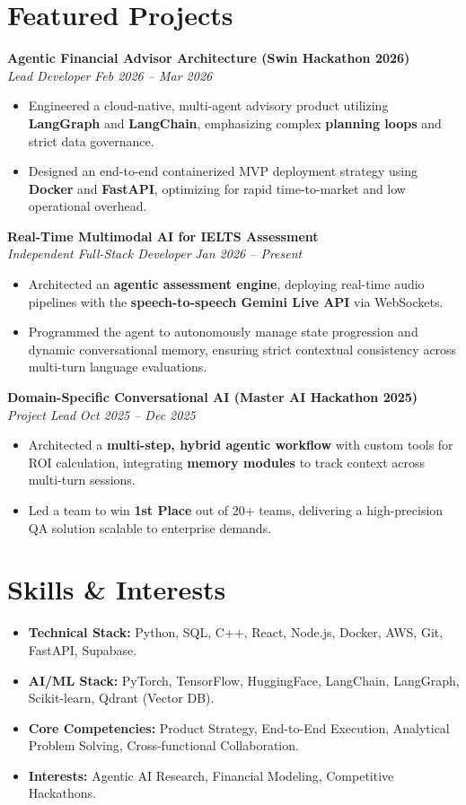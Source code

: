 \documentclass[10pt, letterpaper]{article}
\newcommand{\entryheader}[4]{
    \noindent\textbf{#1} \hfill #2 \\
    \textit{#3} \hfill \textit{#4} \par
}
\begin{document}
\section{Featured Projects}
\entryheader{Agentic Financial Advisor Architecture (Swin Hackathon 2026)}{}{Lead Developer}{Feb 2026 -- Mar 2026}
\begin{itemize}
    \item Engineered a cloud-native, multi-agent advisory product utilizing \textbf{LangGraph} and \textbf{LangChain}, emphasizing complex \textbf{planning loops} and strict data governance.
    \item Designed an end-to-end containerized MVP deployment strategy using \textbf{Docker} and \textbf{FastAPI}, optimizing for rapid time-to-market and low operational overhead.
\end{itemize}

\vspace{6pt}
\entryheader{Real-Time Multimodal AI for IELTS Assessment}{}{Independent Full-Stack Developer}{Jan 2026 -- Present}
\begin{itemize}
    \item Architected an \textbf{agentic assessment engine}, deploying real-time audio pipelines with the \textbf{speech-to-speech Gemini Live API} via WebSockets.
    \item Programmed the agent to autonomously manage state progression and dynamic conversational memory, ensuring strict contextual consistency across multi-turn language evaluations.
\end{itemize}

\vspace{6pt}
\entryheader{Domain-Specific Conversational AI (Master AI Hackathon 2025)}{}{Project Lead}{Oct 2025 -- Dec 2025}
\begin{itemize}
    \item Architected a \textbf{multi-step, hybrid agentic workflow} with custom tools for ROI calculation, integrating \textbf{memory modules} to track context across multi-turn sessions.
    \item Led a team to win \textbf{1st Place} out of 20+ teams, delivering a high-precision QA solution scalable to enterprise demands.
\end{itemize}

\section{Skills \& Interests}
\begin{itemize}
    \item \textbf{Technical Stack:} Python, SQL, C++, React, Node.js, Docker, AWS, Git, FastAPI, Supabase.
    \item \textbf{AI/ML Stack:} PyTorch, TensorFlow, HuggingFace, LangChain, LangGraph, Scikit-learn, Qdrant (Vector DB).
    \item \textbf{Core Competencies:} Product Strategy, End-to-End Execution, Analytical Problem Solving, Cross-functional Collaboration.
    \item \textbf{Interests:} Agentic AI Research, Financial Modeling, Competitive Hackathons.
\end{itemize}
\end{document}

